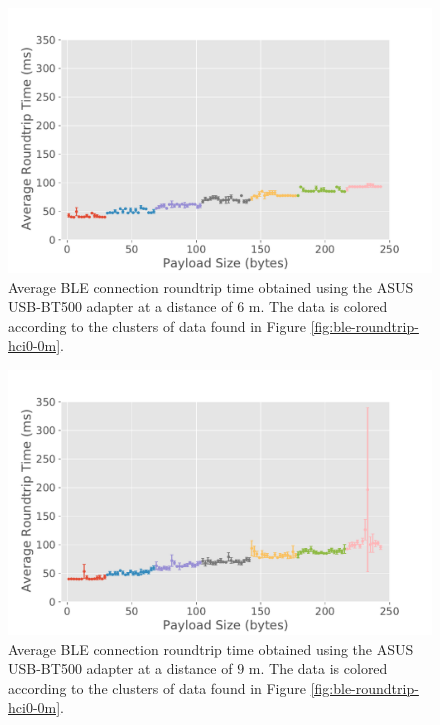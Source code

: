 \begin{figure}[H]
    \centering
    \includegraphics[width=0.9\linewidth]{images/ble-roundtrip-hci0-600cm.pdf}
    \caption[Average \acs{BLE} connection roundtrip time obtained using the ASUS USB-BT500 adapter at a distance of 6 m.]{Average \acs{BLE} connection roundtrip time obtained using the ASUS USB-BT500 adapter at a distance of $6\text{ m}$. The data is colored according to the clusters of data found in Figure \ref{fig:ble-roundtrip-hci0-0m}.}
    \label{fig:ble-roundtrip-hci0-6m}
\end{figure}

\begin{figure}[H]
    \centering
    \includegraphics[width=0.9\linewidth]{images/ble-roundtrip-hci0-900cm.pdf}
    \caption[Average \acs{BLE} connection roundtrip time obtained using the ASUS USB-BT500 adapter at a distance of 9 m.]{Average \acs{BLE} connection roundtrip time obtained using the ASUS USB-BT500 adapter at a distance of $9\text{ m}$. The data is colored according to the clusters of data found in Figure \ref{fig:ble-roundtrip-hci0-0m}.}
    \label{fig:ble-roundtrip-hci0-9m}
\end{figure}

